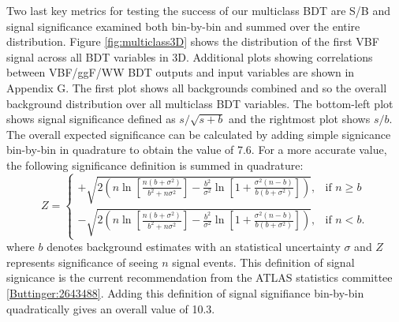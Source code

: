 Two last key metrics for testing the success of our multiclass BDT are S/B and signal significance examined both bin-by-bin and summed over the entire distribution. Figure \ref{fig:multiclass3D} shows the distribution of the first VBF signal across all BDT variables in 3D. Additional plots showing correlations between VBF/ggF/WW BDT outputs and input variables are shown in Appendix G. The first plot shows all backgrounds combined and so the overall background distribution over all multiclass BDT variables. The bottom-left plot shows signal significance defined as $s/\sqrt{s+b}$ and the rightmost plot shows $s/b$. The overall expected significance can be calculated by adding simple signicance bin-by-bin in quadrature to obtain the value of 7.6. For a more accurate value, the following significance definition is summed in quadrature:
\[
    Z = 
\begin{cases}
    +\sqrt{2(n\ln[\frac{n(b+\sigma^2)}{b^2+n\sigma^2}]-\frac{b^2}{\sigma^2}\ln[1+\frac{\sigma^2(n-b)}{b(b+\sigma^2)}])},& \text{if } n\geq b\\
    -\sqrt{2(n\ln[\frac{n(b+\sigma^2)}{b^2+n\sigma^2}]-\frac{b^2}{\sigma^2}\ln[1+\frac{\sigma^2(n-b)}{b(b+\sigma^2)}])},& \text{if } n<b .
\end{cases}
\] 
where $b$ denotes background estimates with an statistical uncertainty $\sigma$ and $Z$ represents significance of seeing $n$ signal events. This definition of signal signicance is the current recommendation from the ATLAS statistics committee \ref{Buttinger:2643488}. Adding this definition of signal signifiance bin-by-bin quadratically gives an overall value of 10.3.

